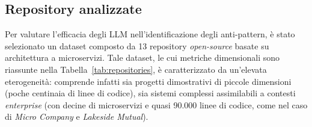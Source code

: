 \begin{table}[H]
    \centering
    \caption{Lista LLM utilizzati.}
    \label{tab:llm-selection}
    \vspace{0.2cm}
    \renewcommand{\arraystretch}{1.3}
\end{table}

\subsection{Repository analizzate}

Per valutare l'efficacia degli LLM nell'identificazione degli anti-pattern, è stato selezionato un dataset composto da 13 repository \textit{open-source} basate su architettura a microservizi. Tale dataset, le cui metriche dimensionali sono riassunte nella Tabella~\ref{tab:repositories}, è caratterizzato da un'elevata eterogeneità: comprende infatti sia progetti dimostrativi di piccole dimensioni (poche centinaia di linee di codice), sia sistemi complessi assimilabili a contesti \textit{enterprise} (con decine di microservizi e quasi 90.000 linee di codice, come nel caso di \textit{Micro Company} e \textit{Lakeside Mutual}).

